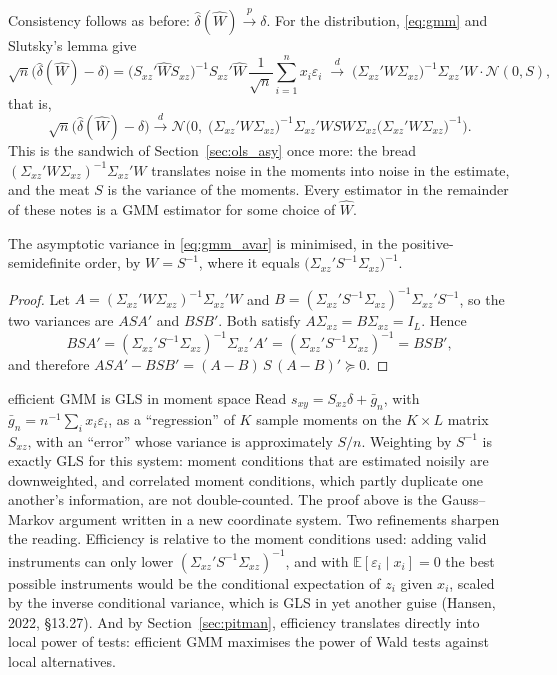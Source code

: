 \documentclass[11pt,a4paper]{article}
\newcommand{\E}{\mathbb{E}}
\newcommand{\N}{\mathcal{N}}
\newcommand{\cp}{\xrightarrow{\;p\;}}
\newcommand{\cd}{\xrightarrow{\;d\;}}
\newcommand{\dhat}{\hat\delta}
\newcommand{\sxz}{\Sigma_{xz}}
\newcommand{\Sxz}{S_{xz}}
\begin{document}
Consistency follows as before: $\dhat(\hat W)\cp\delta$. For the distribution, \eqref{eq:gmm} and Slutsky's lemma give
\[
\sqrt n\big(\dhat(\hat W)-\delta\big)=\big(\Sxz'\hat W\Sxz\big)^{-1}\Sxz'\hat W\,\frac1{\sqrt n}\sum_{i=1}^nx_i\varepsilon_i\;\cd\;\big(\sxz'W\sxz\big)^{-1}\sxz'W\cdot\N(0,S),
\]
that is,
\begin{equation}\label{eq:gmm_avar}
\sqrt n\big(\dhat(\hat W)-\delta\big)\cd\N\Big(0,\;\big(\sxz'W\sxz\big)^{-1}\sxz'WSW\sxz\big(\sxz'W\sxz\big)^{-1}\Big).
\end{equation}
This is the sandwich of Section~\ref{sec:ols_asy} once more: the bread $(\sxz'W\sxz)^{-1}\sxz'W$ translates noise in the moments into noise in the estimate, and the meat $S$ is the variance of the moments. Every estimator in the remainder of these notes is a GMM estimator for some choice of $\hat W$.

\begin{theorem}
The asymptotic variance in \eqref{eq:gmm_avar} is minimised, in the positive-semidefinite order, by $W=S^{-1}$, where it equals $\big(\sxz'S^{-1}\sxz\big)^{-1}$.
\end{theorem}

\begin{proof}
Let $A=(\sxz'W\sxz)^{-1}\sxz'W$ and $B=(\sxz'S^{-1}\sxz)^{-1}\sxz'S^{-1}$, so the two variances are $ASA'$ and $BSB'$. Both satisfy $A\sxz=B\sxz=I_L$. Hence
\[
BSA'=(\sxz'S^{-1}\sxz)^{-1}\sxz'A'=(\sxz'S^{-1}\sxz)^{-1}=BSB',
\]
and therefore $ASA'-BSB'=(A-B)\,S\,(A-B)'\succeq0$.
\end{proof}

\begin{whybox}{efficient GMM is GLS in moment space}
Read $s_{xy}=\Sxz\delta+\bar g_n$, with $\bar g_n=n^{-1}\sum_ix_i\varepsilon_i$, as a ``regression'' of $K$ sample moments on the $K\times L$ matrix $\Sxz$, with an ``error'' whose variance is approximately $S/n$. Weighting by $S^{-1}$ is exactly GLS for this system: moment conditions that are estimated noisily are downweighted, and correlated moment conditions, which partly duplicate one another's information, are not double-counted. The proof above is the Gauss--Markov argument written in a new coordinate system. Two refinements sharpen the reading. Efficiency is relative to the moment conditions used: adding valid instruments can only lower $(\sxz'S^{-1}\sxz)^{-1}$, and with $\E[\varepsilon_i\mid x_i]=0$ the best possible instruments would be the conditional expectation of $z_i$ given $x_i$, scaled by the inverse conditional variance, which is GLS in yet another guise (Hansen, 2022, \S13.27). And by Section~\ref{sec:pitman}, efficiency translates directly into local power of tests: efficient GMM maximises the power of Wald tests against local alternatives.
\end{whybox}
\end{document}
